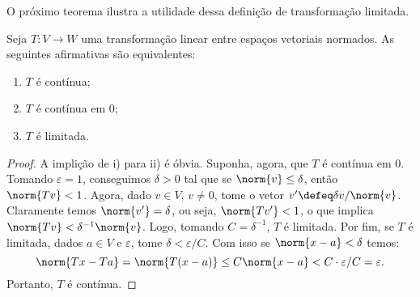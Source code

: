 O próximo teorema ilustra a utilidade dessa definição de transformação limitada.

\begin{teo}
    Seja \( T : V \to W \) uma transformação linear entre espaços vetoriais normados.
    As seguintes afirmativas são equivalentes:
    \begin{enumerate}[label=\roman*)]
        \item \( T \) é contínua;
        \item \( T \) é contínua em \( 0 \);
        \item \( T \) é limitada.
    \end{enumerate}
\end{teo}
\begin{proof}
    A implição de i) para ii) é óbvia.
    Suponha, agora, que \( T \) é contínua em \( 0 \).
    Tomando \( \varepsilon = 1 \), conseguimos \( \delta > 0 \) tal que se \( \norm{ v } \leq \delta \), então \( \norm{ Tv } < 1 \).
    Agora, dado \( v \in V \), \( v \neq 0 \), tome o vetor \( v' \defeq \delta v / \norm{ v } \).
    Claramente temos \( \norm{ v' } = \delta \), ou seja, \( \norm{ Tv' } < 1 \), o que implica \( \norm{ Tv } < \delta^{ -1 } \norm{ v } \).
    Logo, tomando \( C = \delta^{ -1 } \), \( T \) é limitada.
    Por fim, se \( T \) é limitada, dados \( a \in V \) e \( \varepsilon \), tome \( \delta < \varepsilon/C \).
    Com isso se \( \norm{ x - a } < \delta \) temos:
    \begin{equation}
        \norm{ Tx - Ta } = \norm{ T(x - a) } \leq C \norm{ x - a } < C \cdot \varepsilon/C = \varepsilon
    .\end{equation}
    Portanto, \( T \) é contínua.
\end{proof}

